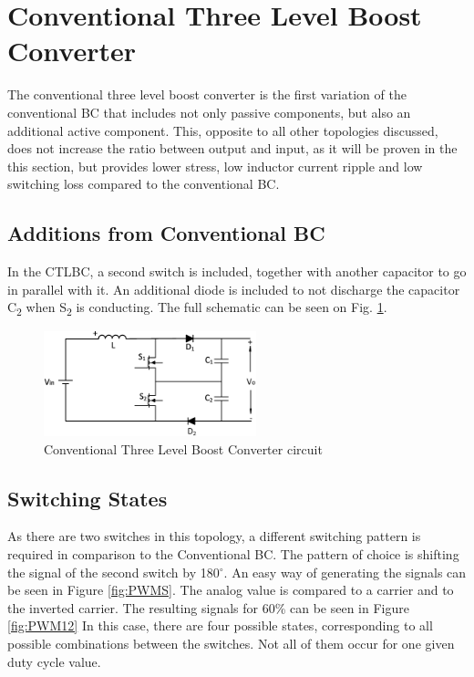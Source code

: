 \section{Conventional Three Level Boost Converter}\label{ch:TLBC}

The conventional three level boost converter is the first variation of the conventional BC that includes not only passive components, but also an additional active component. 
This, opposite to all other topologies discussed, does not increase the ratio between output and input, as it will be proven in the this section, but provides lower stress, low inductor current ripple and low switching loss compared to the conventional BC. \cite{Tran2017}
\vspace{-4mm}
\subsection{Additions from Conventional BC}
In the CTLBC, a second switch is included, together with another capacitor to go in parallel with it. 
An additional diode is included to not discharge the capacitor C\textsubscript{2} when S\textsubscript{2} is conducting.
The full schematic can be seen on Fig. \ref{fig:CTLBC}.  

\begin{figure} [H]
   \centering
   \includegraphics[width=0.55\textwidth]{figures/dConventionalThreeLevelBC/Three_level.pdf}
    \caption{Conventional Three Level Boost Converter circuit}
	\label{fig:CTLBC}
\end{figure}
\vspace{-8mm}
\subsection{Switching States}

As there are two switches in this topology, a different switching pattern is required in comparison to the Conventional BC. The pattern of choice is shifting the signal of the second switch by 180$^\circ$.
An easy way of generating the signals can be seen in Figure \ref{fig:PWMS}. The analog value is compared to a carrier and to the inverted carrier. The resulting signals for 60\% can be seen in Figure \ref{fig:PWM12}
In this case, there are four possible states, corresponding to all possible combinations between the switches. Not all of them occur for one given duty cycle value. 

